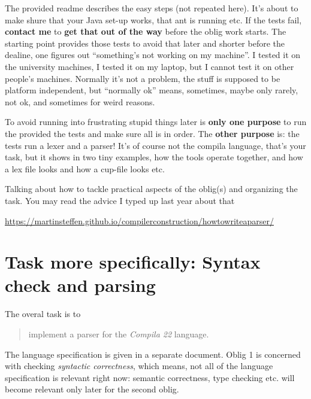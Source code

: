 \documentclass[10pt,freeform]{handout}[2014/08/13]
\begin{document}
The provided readme describes the easy steps (not repeated here). It's
about to make shure that your Java set-up works, that ant is running
etc. If the tests fail, \textbf{contact me} to \textbf{get that out of the
  way} before the oblig work starts. The starting point provides those
tests to avoid that later and shorter before the dealine, one figures out
``something's not working on my machine''. I tested it on the university
machines, I tested it on my laptop, but I cannot test it on other people's
machines.  Normally it's not a problem, the stuff is supposed to be
platform independent, but ``normally ok'' means, sometimes, maybe only
rarely, not ok, and sometimes for weird reasons.

To avoid running into frustrating stupid things later is \textbf{only one
  purpose} to run the provided the tests and make sure all is in order. The
\textbf{other purpose} is: the tests run a lexer and a parser!  It's of
course not the compila language, that's your task, but it shows in two tiny
examples, how the tools operate together, and how a lex file looks and how
a cup-file looks etc.

Talking about how to tackle practical aspects of the oblig(s) and
organizing the task. You may read the advice I typed up last year about that

\begin{center}
  \url{https://martinsteffen.github.io/compilerconstruction/howtowriteaparser/}
\end{center}





\section{Task more specifically: Syntax check and parsing}
\label{sec:task-more-spec}


The overal task is to 

\begin{quote}
  implement a parser for the \textsl{Compila 22} language.
\end{quote}
The language specification is given in a separate document. Oblig 1 is
concerned with checking \emph{syntactic correctness}, which means, not all
of the language specification is relevant right now: semantic correctness,
type checking etc. will become relevant only later for the second oblig.
\end{document}
